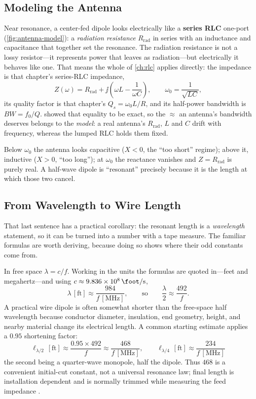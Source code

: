 \subsection{Modeling the Antenna}
Near resonance, a center-fed dipole looks electrically like a \textbf{series RLC}
one-port (\cref{fig:antenna-model}): a \emph{radiation resistance} \(R_{\text{rad}}\)
in series with an inductance and capacitance that together set the resonance. The
radiation resistance is not a lossy resistor---it represents power that leaves as
radiation---but electrically it behaves like one. That means the whole of
\cref{ch:rlc} applies directly: the impedance is that chapter's series-RLC impedance,
\[
Z(\omega)=R_{\text{rad}}+\jj\left(\omega L-\frac{1}{\omega C}\right),
\qquad
\omega_0=\frac{1}{\sqrt{LC}} ,
\]
its quality factor is that chapter's \(Q_s=\omega_0L/R\), and its half-power
bandwidth is \(BW=f_0/Q\).  showed that equality to be exact,
so the \(\approx\) an antenna's bandwidth deserves belongs to the \emph{model}: a
real antenna's \(R_{\text{rad}}\), \(L\) and \(C\) drift with frequency, whereas the
lumped RLC holds them fixed.

Below \(\omega_0\) the antenna looks capacitive (\(X<0\), the ``too short''
regime); above it, inductive (\(X>0\), ``too long''); at \(\omega_0\) the
reactance vanishes and \(Z=R_{\text{rad}}\) is purely real. A half-wave dipole is
``resonant'' precisely because it is the length at which those two cancel.

\subsection{From Wavelength to Wire Length}
\label{sec:antennalength}
That last sentence has a practical corollary: the resonant length is a
\emph{wavelength} statement, so it can be turned into a number with a tape measure.
The familiar formulas are worth deriving, because doing so shows where their odd
constants come from.

In free space \(\lambda=c/f\). Working in the units the formulas are quoted
in---feet and megahertz---and using
\(c\approx\SI{9.836e8}{\foot\per\second}\),
\[
\lambda\,[\mathrm{ft}]\approx\frac{984}{f\,[\mathrm{MHz}]},
\qquad\text{so}\qquad
\frac{\lambda}{2}\approx\frac{492}{f} .
\]
A practical wire dipole is often somewhat shorter than the free-space half wavelength
because conductor diameter, insulation, end geometry, height, and nearby material
change its electrical length. A common starting estimate applies a \(0.95\) shortening
factor:
\[
\boxed{\;
\ell_{\lambda/2}\,[\mathrm{ft}]\approx\frac{0.95\times492}{f}
\approx\frac{468}{f\,[\mathrm{MHz}]},
\qquad
\ell_{\lambda/4}\,[\mathrm{ft}]\approx\frac{234}{f\,[\mathrm{MHz}]} \;}
\]
the second being a quarter-wave monopole, half the dipole. Thus \(468\) is a convenient
initial-cut constant, not a universal resonance law; final length is installation
dependent and is normally trimmed while measuring the feed impedance
\cite[pp.~367--372]{free2022rfmicrowave}.

